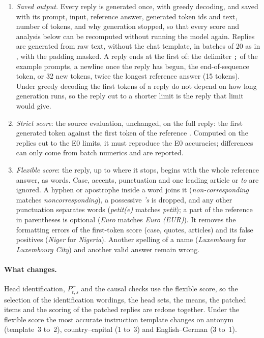 \documentclass[11pt,a4paper]{article}
\begin{document}
\begin{enumerate}
\item \emph{Saved output.} Every reply is generated once, with greedy decoding, and saved with its prompt, input, reference answer, generated token ids and text, number of tokens, and why generation stopped, so that every score and analysis below can be recomputed without running the model again. Replies are generated from raw text, without the chat template, in batches of 20 as in \citet{yang2026shared}, with the padding masked. A reply ends at the first of: the delimiter \texttt{;} of the example prompts, a newline once the reply has begun, the end-of-sequence token, or 32 new tokens, twice the longest reference answer (15 tokens). Under greedy decoding the first tokens of a reply do not depend on how long generation runs, so the reply cut to a shorter limit is the reply that limit would give.
\item \emph{Strict score}: the source evaluation, unchanged, on the full reply: the first generated token against the first token of the reference \citep{yang2026shared}. Computed on the replies cut to the E0 limits, it must reproduce the E0 accuracies; differences can only come from batch numerics and are reported.
\item \emph{Flexible score}: the reply, up to where it stops, begins with the whole reference answer, as words. Case, accents, punctuation and one leading article or \emph{to} are ignored. A hyphen or apostrophe inside a word joins it (\emph{non-corresponding} matches \emph{noncorresponding}), a possessive \emph{'s} is dropped, and any other punctuation separates words (\emph{petit(e)} matches \emph{petit}); a part of the reference in parentheses is optional (\emph{Euro} matches \emph{Euro (EUR)}). It removes the formatting errors of the first-token score (case, quotes, articles) and its false positives (\emph{Niger} for \emph{Nigeria}). Another spelling of a name (\emph{Luxembourg} for \emph{Luxembourg City}) and another valid answer remain wrong.
\end{enumerate}
\paragraph{What changes.} Head identification, $P^{+}_{t,s}$ and the causal checks use the flexible score, so the selection of the identification wordings, the head sets, the means, the patched items and the scoring of the patched replies are redone together. Under the flexible score the most accurate instruction template changes on antonym (template~3 to~2), country--capital (1 to~3) and English--German (3 to~1).
\end{document}
